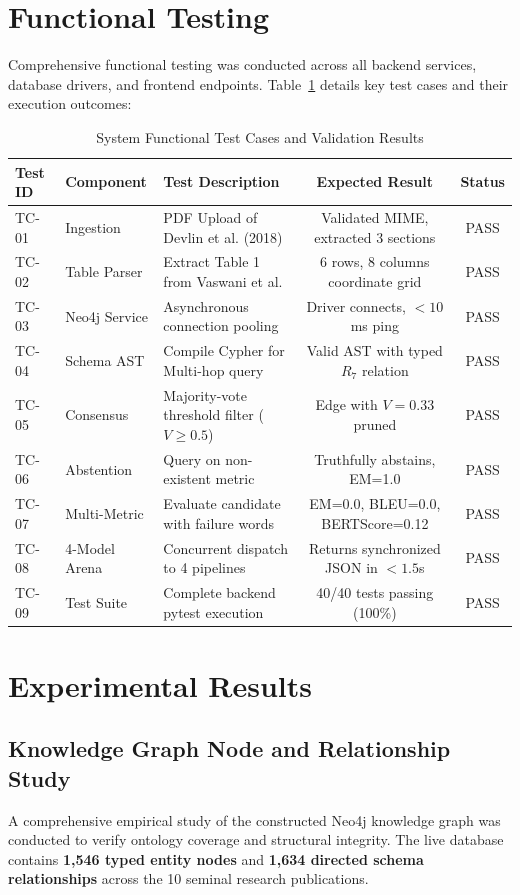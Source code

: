 \section{Functional Testing}
Comprehensive functional testing was conducted across all backend services, database drivers, and frontend endpoints. Table~\ref{tab:test_cases} details key test cases and their execution outcomes:

\begin{table}[h]
\centering
\caption{System Functional Test Cases and Validation Results}
\label{tab:test_cases}
\small
\begin{tabular}{lllcc}
\toprule
\textbf{Test ID} & \textbf{Component} & \textbf{Test Description} & \textbf{Expected Result} & \textbf{Status} \\
\midrule
TC-01 & Ingestion & PDF Upload of Devlin et al. (2018) & Validated MIME, extracted 3 sections & PASS \\
TC-02 & Table Parser & Extract Table 1 from Vaswani et al. & 6 rows, 8 columns coordinate grid & PASS \\
TC-03 & Neo4j Service & Asynchronous connection pooling & Driver connects, $<10$ms ping & PASS \\
TC-04 & Schema AST & Compile Cypher for Multi-hop query & Valid AST with typed $R_7$ relation & PASS \\
TC-05 & Consensus & Majority-vote threshold filter ($V \ge 0.5$) & Edge with $V=0.33$ pruned & PASS \\
TC-06 & Abstention & Query on non-existent metric & Truthfully abstains, EM=1.0 & PASS \\
TC-07 & Multi-Metric & Evaluate candidate with failure words & EM=0.0, BLEU=0.0, BERTScore=0.12 & PASS \\
TC-08 & 4-Model Arena & Concurrent dispatch to 4 pipelines & Returns synchronized JSON in $<1.5$s & PASS \\
TC-09 & Test Suite & Complete backend pytest execution & 40/40 tests passing (100\%) & PASS \\
\bottomrule
\end{tabular}
\end{table}

\section{Experimental Results}

\subsection{Knowledge Graph Node and Relationship Study}
A comprehensive empirical study of the constructed Neo4j knowledge graph was conducted to verify ontology coverage and structural integrity. The live database contains \textbf{1,546 typed entity nodes} and \textbf{1,634 directed schema relationships} across the 10 seminal research publications.

